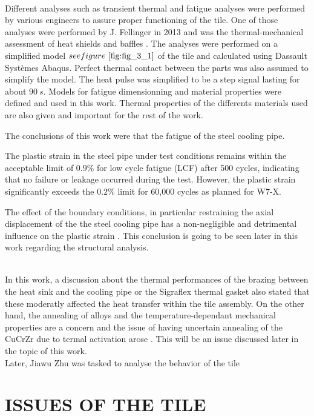 \\
\break
\normalsize{\indent Different analyses such as transient thermal and fatigue analyses were performed by various engineers to assure proper functioning of the tile. One of those analyses were performed by J. Fellinger in 2013 and was the thermal-mechanical assessment of heat shields and baffles \cites{Fellinger_2013}. The analyses were performed on a simplified model $see figure \ \ref{fig:fig_3_1}$ of the tile and calculated using Dassault Systèmes Abaqus. Perfect thermal contact between the parts was also assumed to simplify the model. The heat pulse was simplified to be a step signal lasting for about $90 \ s$. Models for fatigue dimensionning and material properties were defined and used in this work. Thermal properties of the differents materials used are also given and important for the rest of the work.}
\\
\break
\normalsize{
\indent The conclusions of this work were that the fatigue of the steel cooling pipe.

 The plastic strain in the steel pipe under test conditions remains within the acceptable limit of $0.9 \% $ for low cycle fatigue (LCF) after 500 cycles, indicating that no failure or leakage occurred during the test. However, the plastic strain significantly exceeds the $0.2 \%$ limit for 60,000 cycles as planned for \acrshort{W7-X}.

The effect of the boundary conditions, in particular restraining the axial displacement of the the steel cooling pipe has a non-negligible and detrimental influence on the plastic strain \cites{Fellinger_2013}. This conclusion is going to be seen later in this work regarding the structural analysis.
}
\\
\break
\normalsize{\indent In this work, a discussion about the thermal performances of the brazing between the heat sink and the cooling pipe or the Sigraflex thermal gasket also stated that these moderatly affected the heat transfer within the tile assembly. On the other hand, the annealing of alloys and the temperature-dependant mechanical properties are a concern and the issue of having uncertain annealing of the \acrshort{CuCrZr} due to termal activation arose \cites{Fellinger_2013}. This will be an issue discussed later in the topic of this work.}
\\
\break
\normalsize{\indent Later, Jiawu Zhu was tasked to analyse the behavior of the tile }

\section{ISSUES OF THE TILE}

